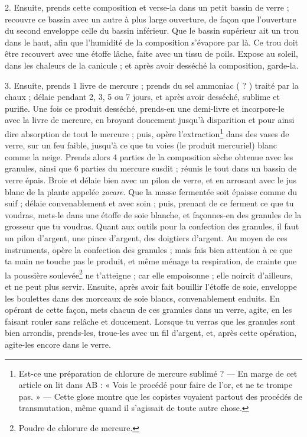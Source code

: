 \documentclass[a4paper, 11pt, oneside, polutonikogreek, french]{article}
\begin{document}
2. Ensuite, prends cette composition et verse-la dans un petit bassin de verre ; recouvre ce bassin avec un autre à plus large ouverture, de façon que l'ouverture du second enveloppe celle du bassin inférieur. Que le bassin supérieur ait un trou dans le haut, afin que l'humidité de la composition s'évapore par là. Ce trou doit être recouvert avec une étoffe lâche, faite avec un tissu de poils. Expose au soleil, dans les chaleurs de la canicule ; et après avoir desséché la composition, garde-la.

3. Ensuite, prends 1 livre de mercure ; prends du sel ammoniac ( ? ) traité par la chaux ; délaie pendant 2, 3, 5 ou 7 jours, et après avoir desséché, sublime et purifie. Une fois ce produit desséché, prends-en une demi-livre et incorpore-le avec la livre de mercure, en broyant doucement jusqu'à disparition et pour ainsi dire absorption de tout le mercure ; puis, opère l'extraction\footnote{Est-ce une préparation de chlorure de mercure sublimé ? --- En marge de cet article on lit dans AB : « Vois le procédé pour faire de l'or, et ne te trompe pas. » --- Cette glose montre que les copistes voyaient partout des procédés de transmutation, même quand il s'agissait de toute autre chose.} dans des vases de verre, sur un feu faible, jusqu'à ce que tu voies (le produit mercuriel) blanc comme la neige. Prends alors 4 parties de la composition sèche obtenue avec les granules, ainsi que 6 parties du mercure susdit ; réunis le tout dans un bassin de verre épais. Broie et délaie bien avec un pilon de verre, et en arrosant avec le jus blanc de la plante appelée \emph{zocare}. Que la masse fermentée soit épaisse comme du suif ; délaie convenablement et avec soin ; puis, prenant de ce ferment ce que tu voudras, mets-le dans une étoffe de soie blanche, et façonnes-en des granules de la grosseur que tu voudras. Quant aux outils pour la confection des granules, il faut un pilon d'argent, une pince d'argent, des doigtiers d'argent. Au moyen de ces instruments, opère la confection des granules ; mais fais bien attention à ce que ta main ne touche pas le produit, et même ménage ta respiration, de crainte que la poussière soulevée\footnote{Poudre de chlorure de mercure.} ne t'atteigne ; car elle empoisonne ; elle noircit d'ailleurs, et ne peut plus servir. Ensuite, après avoir fait bouillir l'étoffe de soie, enveloppe les boulettes dans des morceaux de soie blancs, convenablement enduits. En opérant de cette façon, mets chacun de ces granules dans un verre, agite, en les faisant rouler sans relâche et doucement. Lorsque tu verras que les granules sont bien arrondis, prends-les, troue-les avec un fil d'argent, et, après cette opération, agite-les encore dans le verre.
\end{document}
